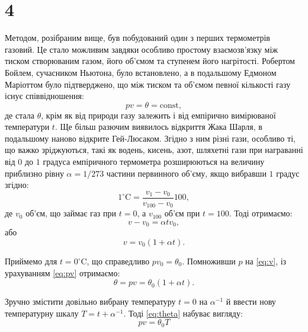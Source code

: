 \section{4}





Методом, розібраним вище, був побудований  один з перших термометрів  газовий. Це стало можливим завдяки особливо простому взаємозв'язку між тиском створюваним газом, його об'ємом та ступенем його нагрітості. Робертом Бойлем, сучасником Ньютона, було встановлено, а в подальшому Едмоном Маріоттом було підтверджено, що між тиском та об’ємом певної кількості газу існує співвідношення:
\begin{equation}\label{eq:pv}
    pv = \theta = \mathrm{const},
\end{equation}
де стала $\theta$, крім як від природи газу залежить і від емпірично вимірюваної температури $t$. Ще більш разючим виявилось відкриття Жака Шарля, в подальшому наново відкрите Гей-Люсаком. Згідно з ним різні гази, особливо ті, що важко зріджуються, такі як водень, кисень, азот, шляхетні гази при награванні від $0$ до $1$ градуса емпіричного термометра розширюються на величину приблизно рівну $\alpha=1/273$ частини первинного об'єму, якщо вибравши $1$ градус згідно:
\begin{equation}
    1^\circ\text{C} = \frac{v_1 - v_0}{v_{100} - v_0} 100,
\end{equation}
де $v_0$ об’єм, що займає газ при $t=0$, а $v_{100}$ об’єм при $t=100$. Тоді отримаємо:
\begin{equation}
    v-v_0=\alpha t v_0,
\end{equation}
або
\begin{equation}\label{eq:v}
    v=v_0 (1+\alpha t).
\end{equation}

Приймемо для $t = 0^\circ$C, що справедливо $pv_0=\theta_0$. Помноживши $p$ на \eqref{eq:v}, із урахуванням \eqref{eq:pv} отримаємо:
\begin{equation}\label{eq:theta}
    \theta = pv = \theta_0 (1+\alpha t).
\end{equation}

Зручно змістити довільно вибрану температуру $t=0$ на $\alpha^{-1}$ й ввести нову температурну шкалу $T=t+\alpha^{-1}$. Тоді \eqref{eq:theta} набуває вигляду:
\begin{equation}\label{eq:theta2}
    pv = \theta_0T
\end{equation}

